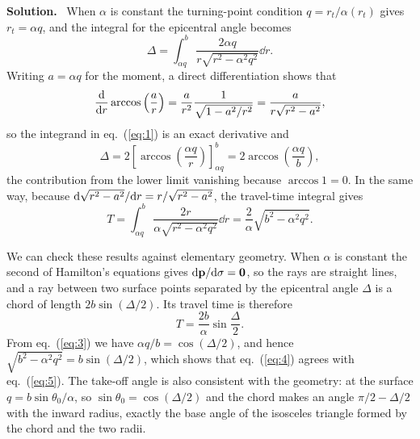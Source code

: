 \documentclass[a4paper,12pt]{paper}
\newenvironment{solution}{\par\noindent\textbf{Solution.}\ }{\par\medskip}
\begin{document}
\begin{solution}
When $\alpha$ is constant the turning-point condition $q=r_{t}/\alpha(r_{t})$ gives
$r_{t}=\alpha q$, and the integral for the epicentral angle becomes
\begin{equation}
\Delta=\int_{\alpha q}^{b}\frac{2\alpha q}{r\sqrt{r^{2}-\alpha^{2}q^{2}}}\dd r.
\label{eq:1}
\end{equation}
Writing $a=\alpha q$ for the moment, a direct differentiation shows that
\begin{equation}
\frac{\mathrm{d}}{\mathrm{d} r}\arccos\left(\frac{a}{r}\right)=\frac{a}{r^{2}}\frac{1}{\sqrt{1-a^{2}/r^{2}}}
=\frac{a}{r\sqrt{r^{2}-a^{2}}},
\label{eq:2}
\end{equation}
so the integrand in eq.~(\ref{eq:1}) is an exact derivative and
\begin{equation}
\Delta=2\left[\arccos\left(\frac{\alpha q}{r}\right)\right]_{\alpha q}^{b}=2\arccos\left(\frac{\alpha q}{b}\right),
\label{eq:3}
\end{equation}
the contribution from the lower limit vanishing because $\arccos 1=0$. In the same way,
because $\mathrm{d}\sqrt{r^{2}-a^{2}}/\mathrm{d} r=r/\sqrt{r^{2}-a^{2}}$, the travel-time integral gives
\begin{equation}
T=\int_{\alpha q}^{b}\frac{2r}{\alpha\sqrt{r^{2}-\alpha^{2}q^{2}}}\dd r
=\frac{2}{\alpha}\sqrt{b^{2}-\alpha^{2}q^{2}}.
\label{eq:4}
\end{equation}

We can check these results against elementary geometry. When $\alpha$ is constant the second
of Hamilton's equations gives $\mathrm{d}\mathbf{p}/\mathrm{d}\sigma=\mathbf{0}$, so the rays are straight
lines, and a ray between two surface points separated by the epicentral angle $\Delta$ is a
chord of length $2b\sin(\Delta/2)$. Its travel time is therefore
\begin{equation}
T=\frac{2b}{\alpha}\sin\frac{\Delta}{2}.
\label{eq:5}
\end{equation}
From eq.~(\ref{eq:3}) we have $\alpha q/b=\cos(\Delta/2)$, and hence
$\sqrt{b^{2}-\alpha^{2}q^{2}}=b\sin(\Delta/2)$, which shows that eq.~(\ref{eq:4}) agrees with
eq.~(\ref{eq:5}). The take-off angle is also consistent with the geometry: at the surface
$q=b\sin\theta_{0}/\alpha$, so $\sin\theta_{0}=\cos(\Delta/2)$ and the chord makes an angle
$\pi/2-\Delta/2$ with the inward radius, exactly the base angle of the isosceles triangle formed
by the chord and the two radii.


\end{solution}
\end{document}
